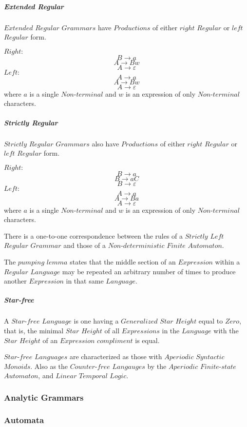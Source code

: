 \documentclass{article}
\begin{document}
    \subparagraph{Extended Regular}
    $Extended$ $Regular$ $Grammars$ have $Productions$ of either
    $right$ $Regular$ or $left$ $Regular$ form.

    $Right:$
    \[
        B \rightarrow a
    \]\[
        A \rightarrow Bw
    \]\[
        A \rightarrow \varepsilon
    \]
    $Left:$
    \[
        A \rightarrow a
    \]\[
        A \rightarrow Bw
    \]\[
        A \rightarrow \varepsilon
    \]
    where $a$ is a single $Non$-$terminal$ and $w$ is an expression of
    only $Non$-$terminal$ characters.

    \subparagraph{Strictly Regular}
    $Strictly$ $Regular$ $Grammars$ also have $Productions$ of either
    $right$ $Regular$ or $left$ $Regular$ form.

    $Right:$
    \[
        B \rightarrow a
    \]\[
        B \rightarrow aC
    \]\[
        B \rightarrow \varepsilon
    \]
    $Left:$
    \[
        A \rightarrow a
    \]\[
        A \rightarrow Ba
    \]\[
        A \rightarrow \varepsilon
    \]
    where $a$ is a single $Non$-$terminal$ and $w$ is an expression of
    only $Non$-$terminal$ characters.

    There is a one-to-one correspondence between the rules of a
    $Strictly$ $Left$ $Regular$ $Grammar$ and those of a
    $Non$-$deterministic$ $Finite$ $Automaton$.

    The $pumping$ $lemma$ states that the middle section of an
    $Expression$ within a $Regular$ $Language$ may be repeated an
    arbitrary number of times to produce another $Expression$ in that
    same $Language$.

    \subparagraph{Star-free}
    A $Star$-$free$ $Language$ is one having a $Generalized$ $Star$
    $Height$ equal to $Zero$, that is, the minimal $Star$ $Height$ of
    all $Expressions$ in the $Language$ with the $Star$ $Height$ of an
    $Expression$ $compliment$ is equal.

    $Star$-$free$ $Languages$ are characterized as those with
    $Aperiodic$ $Syntactic$ $Monoids$. Also as the $Counter$-$free$
    $Langauges$ by the $Aperiodic$ $Finite$-$state$ $Automaton$, and
    $Linear$ $Temporal$ $Logic$.

\subsubsection{Analytic Grammars}

\subsubsection{Automata}
\end{document}
